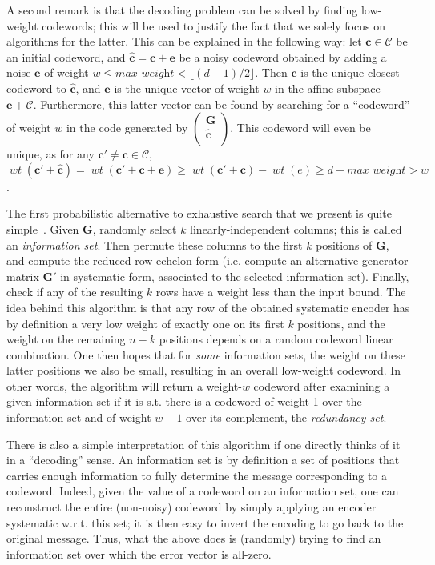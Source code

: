 \documentclass[11pt,a4paper]{article}
\theoremstyle{definition}
\DeclareMathOperator\wt{\mathit{wt}}
\newcommand\code{\mathcal{C}}
\begin{document}
A second remark is that the decoding problem can be solved by finding low-weight codewords; this will be used to justify the fact that we solely focus on algorithms for the latter. This can be explained in the following way: let 
$\bm{c} \in \code$ be an initial codeword, and $\bm{\hat{c}} = \bm{c} + \bm{e}$ be a noisy codeword obtained by adding a noise $\bm{e}$ of weight $w \leq  \textit{max weight} <
\lfloor(d-1)/2\rfloor$. Then $\bm{c}$
is the unique closest codeword to $\bm{\hat{c}}$, and $\bm{e}$ is the unique vector of weight $w$ in the affine subspace $\bm{e} + \code$. Furthermore, this latter vector can be found by searching for a ``codeword'' of weight
$w$ in the code generated by $\begin{pmatrix}\bm{G}\\ \bm{\hat{c}}\\ \end{pmatrix}$. This codeword will even be unique, as for any $\bm{c}' \neq \bm{c} \in \code$, $\wt(\bm{c}' + \bm{\hat{c}}) = \wt(\bm{c}' + \bm{c} + \bm{e})
	\geq \wt(\bm{c}' + \bm{c}) - \wt(e) \geq d - \textit{max weight} > w$.

\medskip

The first probabilistic alternative to exhaustive search that we present is quite simple~\cite{Prange,McEliece}. Given $\bm{G}$, randomly select $k$ linearly-independent columns; this is called an \emph{information set}. Then permute these columns
to the first $k$ positions of $\bm{G}$, and compute the reduced row-echelon form (i.e. compute an alternative generator matrix $\bm{G}'$ in systematic form, associated to the selected information set).
Finally, check if any of the resulting $k$ rows have a weight less than the input bound. The idea behind this algorithm is that any row of the obtained systematic encoder has by definition a very low weight of exactly one on its first $k$ positions,
and the weight on the remaining $n-k$ positions depends on a random codeword linear combination. One then hopes that for \emph{some} information sets, the weight on these latter positions we also be small, resulting in an overall low-weight codeword.
In other words, the algorithm will return a weight-$w$ codeword after examining a given information set if it is s.t. there is a codeword of weight 1 over the information set and of weight
$w - 1$ over its complement, the \emph{redundancy set}.

There is also a simple interpretation of this algorithm if one directly thinks of it in a ``decoding'' sense. An information set is by definition a set of positions that carries enough information to fully determine the message corresponding to a codeword.
Indeed, given the value of a codeword on an information set, one can reconstruct the entire (non-noisy) codeword by simply applying an encoder systematic w.r.t. this set;
it is then easy to invert the encoding to go back to the original message.
Thus, what the above does is (randomly) trying to find an information set over which the error vector is all-zero.
\end{document}
